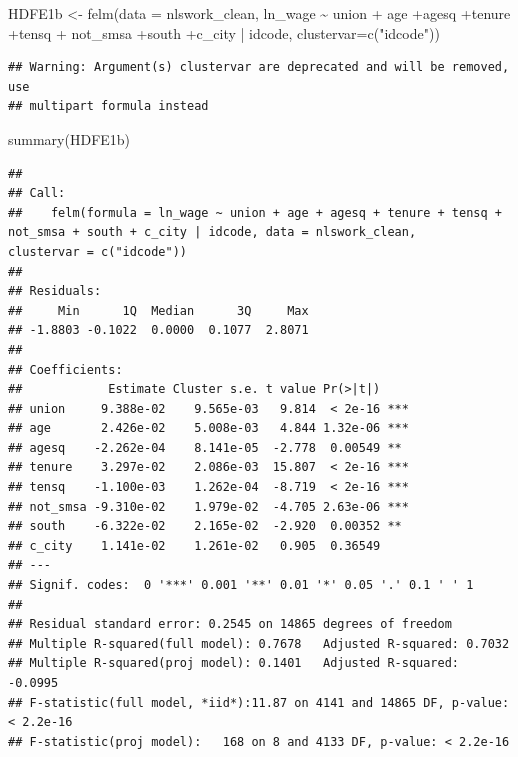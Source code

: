 \documentclass[
]{article}
\newenvironment{Shaded}{\begin{snugshade}}{\end{snugshade}}
\newcommand{\AttributeTok}[1]{\textcolor[rgb]{0.77,0.63,0.00}{#1}}
\newcommand{\FunctionTok}[1]{\textcolor[rgb]{0.00,0.00,0.00}{#1}}
\newcommand{\NormalTok}[1]{#1}
\newcommand{\OtherTok}[1]{\textcolor[rgb]{0.56,0.35,0.01}{#1}}
\newcommand{\SpecialCharTok}[1]{\textcolor[rgb]{0.00,0.00,0.00}{#1}}
\newcommand{\StringTok}[1]{\textcolor[rgb]{0.31,0.60,0.02}{#1}}
\begin{document}
\begin{Shaded}
\begin{Highlighting}[]
\NormalTok{  HDFE1b }\OtherTok{\textless{}{-}} \FunctionTok{felm}\NormalTok{(}\AttributeTok{data =}\NormalTok{ nlswork\_clean, ln\_wage }\SpecialCharTok{\textasciitilde{}}\NormalTok{ union }\SpecialCharTok{+}
\NormalTok{                   age }\SpecialCharTok{+}\NormalTok{agesq }\SpecialCharTok{+}\NormalTok{tenure }\SpecialCharTok{+}\NormalTok{tensq }\SpecialCharTok{+}
\NormalTok{                   not\_smsa }\SpecialCharTok{+}\NormalTok{south }\SpecialCharTok{+}\NormalTok{c\_city }\SpecialCharTok{|}\NormalTok{ idcode, }\AttributeTok{clustervar=}\FunctionTok{c}\NormalTok{(}\StringTok{"idcode"}\NormalTok{))}
\end{Highlighting}
\end{Shaded}

\begin{verbatim}
## Warning: Argument(s) clustervar are deprecated and will be removed, use
## multipart formula instead
\end{verbatim}

\begin{Shaded}
\begin{Highlighting}[]
      \FunctionTok{summary}\NormalTok{(HDFE1b)}
\end{Highlighting}
\end{Shaded}

\begin{verbatim}
## 
## Call:
##    felm(formula = ln_wage ~ union + age + agesq + tenure + tensq +      not_smsa + south + c_city | idcode, data = nlswork_clean,      clustervar = c("idcode")) 
## 
## Residuals:
##     Min      1Q  Median      3Q     Max 
## -1.8803 -0.1022  0.0000  0.1077  2.8071 
## 
## Coefficients:
##            Estimate Cluster s.e. t value Pr(>|t|)    
## union     9.388e-02    9.565e-03   9.814  < 2e-16 ***
## age       2.426e-02    5.008e-03   4.844 1.32e-06 ***
## agesq    -2.262e-04    8.141e-05  -2.778  0.00549 ** 
## tenure    3.297e-02    2.086e-03  15.807  < 2e-16 ***
## tensq    -1.100e-03    1.262e-04  -8.719  < 2e-16 ***
## not_smsa -9.310e-02    1.979e-02  -4.705 2.63e-06 ***
## south    -6.322e-02    2.165e-02  -2.920  0.00352 ** 
## c_city    1.141e-02    1.261e-02   0.905  0.36549    
## ---
## Signif. codes:  0 '***' 0.001 '**' 0.01 '*' 0.05 '.' 0.1 ' ' 1
## 
## Residual standard error: 0.2545 on 14865 degrees of freedom
## Multiple R-squared(full model): 0.7678   Adjusted R-squared: 0.7032 
## Multiple R-squared(proj model): 0.1401   Adjusted R-squared: -0.0995 
## F-statistic(full model, *iid*):11.87 on 4141 and 14865 DF, p-value: < 2.2e-16 
## F-statistic(proj model):   168 on 8 and 4133 DF, p-value: < 2.2e-16
\end{verbatim}
\end{document}
